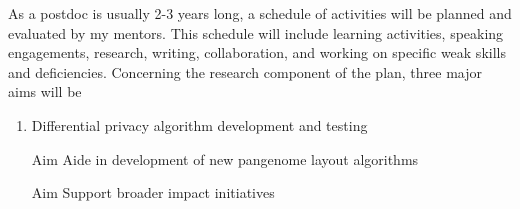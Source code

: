 As a postdoc is usually 2-3 years long, a schedule of activities will be planned and evaluated by my mentors.
This schedule will include learning activities, speaking engagements, research, writing, collaboration, and working on specific weak skills and deficiencies.
Concerning the research component of the plan, three major aims will be 
\begin{enumerate}[noitemsep]
    \item Differential privacy algorithm development and testing
	\item[Aim] Aide in development of new pangenome layout algorithms
	\item[Aim] Support broader impact initiatives 
\end{enumerate} 
